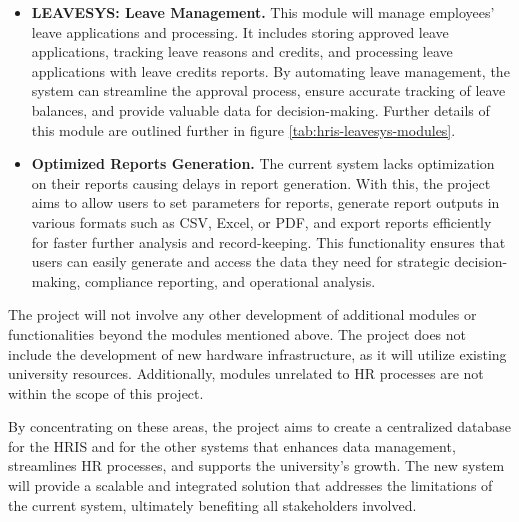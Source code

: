 \begin{itemize}
        \item[] \textbf{LEAVESYS: Leave Management.} This module will manage employees' leave applications and processing. It includes storing approved leave applications, tracking leave reasons and credits, and processing leave applications with leave credits reports. By automating leave management, the system can streamline the approval process, ensure accurate tracking of leave balances, and provide valuable data for decision-making. Further details of this module are outlined further in figure \ref*{tab:hris-leavesys-modules}.
        \item[] \textbf{Optimized Reports Generation.} The current system lacks optimization on their reports causing delays in report generation. With this, the project aims to allow users to set parameters for reports, generate report outputs in various formats such as CSV, Excel, or PDF, and export reports efficiently for faster further analysis and record-keeping. This functionality ensures that users can easily generate and access the data they need for strategic decision-making, compliance reporting, and operational analysis.
    \end{itemize}

    The project will not involve any other development of additional modules or functionalities beyond the modules mentioned above. The project does not include the development of new hardware infrastructure, as it will utilize existing university resources. Additionally, modules unrelated to HR processes are not within the scope of this project.
    
    By concentrating on these areas, the project aims to create a centralized database for the HRIS and for the other systems that enhances data management, streamlines HR processes, and supports the university's growth. The new system will provide a scalable and integrated solution that addresses the limitations of the current system, ultimately benefiting all stakeholders involved.


